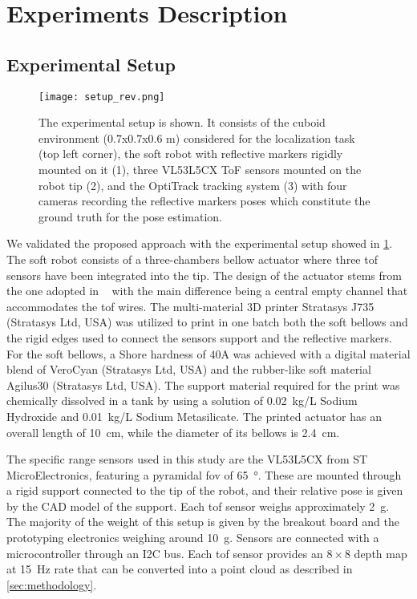 \section{Experiments Description}
\label{sec:validation}

\subsection{Experimental Setup}
\label{sec:setup}

\begin{figure}[]
	\centering
	\texttt{[image: setup\_rev.png]}
	\caption{The experimental setup is shown. It consists of the cuboid environment (0.7x0.7x0.6 m) considered for the localization task (top left corner), the soft robot with reflective markers rigidly mounted on it (1), three VL53L5CX ToF sensors mounted on the robot tip (2), and the OptiTrack tracking system (3) with four cameras recording the reflective markers poses which constitute the ground truth for the pose estimation.}
	\label{fig:setup}
\end{figure}

We validated the proposed approach with the experimental setup showed in \cref{fig:setup}. 
The soft robot consists of a three-chambers bellow actuator where three \gls{tof} sensors have been integrated into the tip. The design of the actuator stems from the one adopted in ~\cite{veronese_robosoft} with the main difference being a central empty channel that accommodates the \gls{tof} wires. The multi-material 3D printer Stratasys J735\textsuperscript{\textregistered} (Stratasys Ltd, USA) was utilized to print in one batch both the soft bellows and the rigid edges used to connect the sensors support and the reflective markers. For the soft bellows, a Shore hardness of $40$A was achieved with a digital material blend of VeroCyan\textsuperscript{\textregistered} (Stratasys Ltd, USA) and the
rubber-like soft material Agilus30\textsuperscript{\textregistered} (Stratasys Ltd, USA). The support material required for the print was chemically dissolved in a tank by using a solution of \SI{0.02}{kg/L} Sodium Hydroxide and \SI{0.01}{kg/L}
Sodium Metasilicate. The printed actuator has an overall length of \SI{10}{cm}, while the diameter of its bellows is \SI{2.4}{cm}.

The specific range sensors used in this study are the VL53L5CX from ST MicroElectronics, featuring a pyramidal \gls{fov} of \SI{65}{\degree}. These are mounted through a rigid support connected to the tip of the robot, and their relative pose is given by the CAD model of the support. 
Each \gls{tof} sensor weighs approximately \SI{2}{\gram}. The majority of the weight of this setup is given by the breakout board and the prototyping electronics weighing around \SI{10}{\gram}. Sensors are connected with a microcontroller through an I2C bus. Each \gls{tof} sensor provides an $8 \times 8$ depth map at \SI{15}{\hertz} rate that can be converted into a point cloud as described in \cref{sec:methodology}.  

